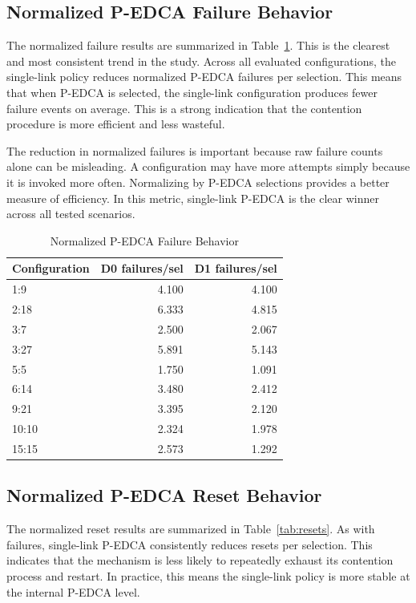 \documentclass[conference]{IEEEtran}
\begin{document}
\subsection{Normalized P-EDCA Failure Behavior}
The normalized failure results are summarized in Table~\ref{tab:failures}. This is the clearest and most consistent trend in the study. Across all evaluated configurations, the single-link policy reduces normalized P-EDCA failures per selection. This means that when P-EDCA is selected, the single-link configuration produces fewer failure events on average. This is a strong indication that the contention procedure is more efficient and less wasteful.

The reduction in normalized failures is important because raw failure counts alone can be misleading. A configuration may have more attempts simply because it is invoked more often. Normalizing by P-EDCA selections provides a better measure of efficiency. In this metric, single-link P-EDCA is the clear winner across all tested scenarios.

\begin{table}[t]
\caption{Normalized P-EDCA Failure Behavior}
\label{tab:failures}
\centering
\small
\begin{tabular}{lrr}
\toprule
Configuration & D0 failures/sel & D1 failures/sel \\
\midrule
1:9   & 4.100 & 4.100 \\
2:18  & 6.333 & 4.815 \\
3:7   & 2.500 & 2.067 \\
3:27  & 5.891 & 5.143 \\
5:5   & 1.750 & 1.091 \\
6:14  & 3.480 & 2.412 \\
9:21  & 3.395 & 2.120 \\
10:10 & 2.324 & 1.978 \\
15:15 & 2.573 & 1.292 \\
\bottomrule
\end{tabular}
\end{table}

\subsection{Normalized P-EDCA Reset Behavior}
The normalized reset results are summarized in Table~\ref{tab:resets}. As with failures, single-link P-EDCA consistently reduces resets per selection. This indicates that the mechanism is less likely to repeatedly exhaust its contention process and restart. In practice, this means the single-link policy is more stable at the internal P-EDCA level.
\end{document}
